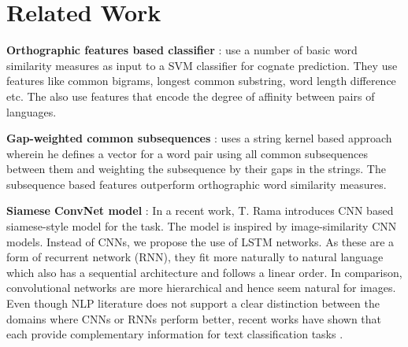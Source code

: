 \documentclass[11pt,letterpaper]{article}
\begin{document}




\section{Related Work}
\textbf{Orthographic features based classifier} : \citet{hauer2011clustering} use a number of basic word similarity measures as input to a SVM classifier for cognate prediction. They use features like common bigrams, longest common substring, word length difference etc. The also use features that encode the degree of affinity between pairs of languages.

\textbf{Gap-weighted common subsequences} : \citet{rama2015automatic} uses a string kernel based approach wherein he defines a vector for a word pair using all common subsequences between them and weighting the subsequence by their gaps in the strings. The subsequence based features outperform orthographic word similarity measures.

\textbf{Siamese ConvNet model} : In a recent work, T. Rama introduces CNN based siamese-style model \citep{rama2016siamese} for the task. The model is inspired by image-similarity CNN models. Instead of CNNs, we propose the use of LSTM networks. As these are a form of recurrent network (RNN), they fit more naturally to natural language which also has a sequential architecture and follows a linear order. In comparison, convolutional networks are more hierarchical and hence seem natural for images. Even though NLP literature does not support a clear distinction between the domains where CNNs or RNNs perform better, recent works have shown that each provide complementary information for text classification tasks \citep{yin2017comparative}. 

\end{document}
